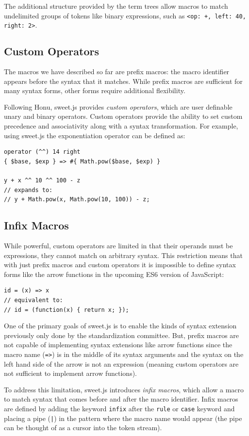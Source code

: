 \documentclass[preprint,10pt]{sigplanconf}
\begin{document}
The additional structure provided by the term trees allow macros to
match undelimited groups of tokens like binary expressions, such as
\verb!<op: +, left: 40, right: 2>!.

\subsection{Custom Operators}
The macros we have described so far are prefix macros: the macro
identifier appears before the syntax that it matches. While prefix
macros are sufficient for many syntax forms, other forms require
additional flexibility.

Following Honu, sweet.js provides \emph{custom operators}, which are
user definable unary and binary operators. Custom operators provide
the ability to set custom precedence and associativity along with a
syntax transformation. For example, using sweet.js the exponentiation
operator can be defined as:
\begin{lstlisting}
operator (^^) 14 right
{ $base, $exp } => #{ Math.pow($base, $exp) }

y + x ^^ 10 ^^ 100 - z
// expands to:
// y + Math.pow(x, Math.pow(10, 100)) - z;
\end{lstlisting}


\subsection{Infix Macros}
\label{sec:infix}
While powerful, custom operators are limited in that their operands
must be expressions, they cannot match on arbitrary syntax.
This restriction means that with just prefix macros and custom
operators it is impossible to define syntax forms like the arrow
functions in the upcoming ES6 version of JavaScript:

\begin{lstlisting}
id = (x) => x
// equivalent to:
// id = (function(x) { return x; });
\end{lstlisting}

One of the primary goals of sweet.js is to enable the kinds of syntax
extension previously only done by the standardization committee. But,
prefix macros are not capable of implementing syntax extensions like
arrow functions since the macro name (\verb!=>!) is in the middle of
its syntax arguments and the syntax on the left hand side of the arrow
is not an expression (meaning custom operators are not sufficient to
implement arrow functions).

To address this limitation, sweet.js introduces \emph{infix macros},
which allow a macro to match syntax that comes before and after the macro
identifier. Infix macros are defined by adding the keyword
\verb!infix! after the \verb!rule! or \verb!case!
keyword and placing a pipe (\verb!|!) in the pattern where the
macro name would appear (the pipe can be thought of as a cursor into
the token stream).
\end{document}
